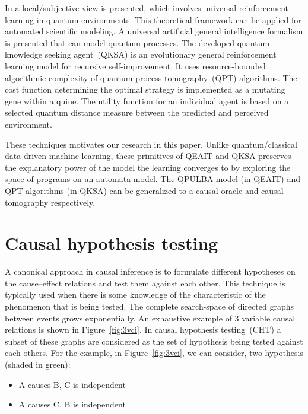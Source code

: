 In \cite{sarkar2021qksa} a local/subjective view is presented, which involves universal reinforcement learning in quantum environments.
This theoretical framework can be applied for automated scientific modeling. 
A universal artificial general intelligence formalism is presented that can model quantum processes. 
The developed quantum knowledge seeking agent~(QKSA) is an evolutionary general reinforcement learning model for recursive self-improvement. 
It uses resource-bounded algorithmic complexity of quantum process tomography~(QPT) algorithms. 
The cost function determining the optimal strategy is implemented as a mutating gene within a quine. 
The utility function for an individual agent is based on a selected quantum distance measure between the predicted and perceived environment.

These techniques motivates our research in this paper.
Unlike quantum/classical data driven machine learning, these primitives of QEAIT and QKSA preserves the explanatory power of the model the learning converges to by exploring the space of programs on an automata model.
The QPULBA model (in QEAIT) and QPT algorithms (in QKSA) can be generalized to a causal oracle and causal tomography respectively.

\section{Causal hypothesis testing} \label{sec:causal-hypothesis-testing}

A canonical approach in causal inference is to formulate different hypotheses on the cause–effect relations and test them against each other.
This technique is typically used when there is some knowledge of the characteristic of the phenomenon that is being tested.
The complete search-space of directed graphs between events grows exponentially.
An exhaustive example of 3 variable causal relations is shown in Figure~\ref{fig:3vci}.
In causal hypothesis testing~(CHT) a subset of these graphs are considered as the set of hypothesis being tested against each others.
For the example, in Figure~\ref{fig:3vci}, we can consider, two hypothesis (shaded in green):
\begin{itemize} [nolistsep,noitemsep]
    \item A causes B, C is independent
    \item A causes C, B is independent
\end{itemize}


